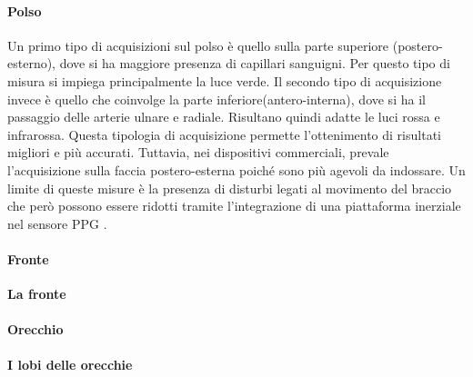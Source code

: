 	 \paragraph{Polso}
	 Un primo tipo di acquisizioni sul polso è quello sulla parte superiore (postero-esterno), dove si ha maggiore presenza di capillari sanguigni. Per questo tipo di misura si impiega principalmente la luce verde.
	 Il secondo tipo di acquisizione invece è quello che coinvolge la parte inferiore(antero-interna), dove si ha il passaggio delle arterie ulnare e radiale. Risultano quindi adatte le luci rossa e infrarossa. Questa tipologia di acquisizione permette l'ottenimento di risultati migliori e più accurati.
	 Tuttavia, nei dispositivi commerciali, prevale l'acquisizione sulla faccia postero-esterna poiché sono più agevoli da indossare.
	 Un limite di queste misure è la presenza di disturbi legati al movimento del braccio che però possono essere ridotti tramite l'integrazione di una piattaforma inerziale nel sensore PPG \cite{Ghamari2018}.
	 \paragraph{Fronte}
 	 \textbf{La fronte}
 	 \paragraph{Orecchio}
	 \textbf{I lobi delle orecchie}

 